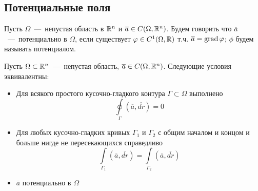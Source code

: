 \subsection{Потенциальные поля}
\begin{definition}
    Пусть $\Omega$~---~непустая область в $\mathbb{R}^n$ и $\overline{a} \in C(\Omega, \mathbb{R}^n)$. Будем говорить что $\overline{a}$~---~потенциально в $\Omega$, если существует $\varphi \in C^1(\Omega, \mathbb{R})$ т.ч. $\overline{a} = \operatorname{grad} \varphi$; $\phi$ будем называть потенциалом.
\end{definition}
\begin{theorem}
    Пусть $\Omega \subset \mathbb{R}^n$~---~непустая область, $\overline{a} \in C(\Omega, \mathbb{R}^n)$. Следующие условия эквивалентны: 
    \begin{itemize}
        \item Для всякого простого кусочно-гладкого контура $\Gamma \subset \Omega$ выполнено \[\oint\limits_\Gamma (\overline{a}, \overline{dr}) = 0\]
        \item Для любых кусочно-гладких кривых $\Gamma_1$ и $\Gamma_2$ с общим началом и концом и больше нигде не пересекающихся справедливо \[\int\limits_{\Gamma_1} (\overline{a}, \overline{dr}) = \int\limits_{\Gamma_2} (\overline{a}, \overline{dr})\]
        \item $\overline{a}$ потенциально в $\Omega$
    \end{itemize}
\end{theorem}
